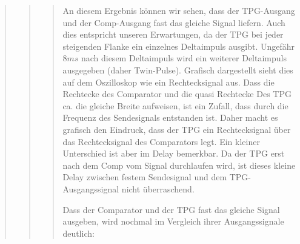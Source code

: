 \begin{quote}
\begin{quote}
\begin{quote}
           An diesem Ergebnis können wir sehen, dass der TPG-Ausgang und der
           Comp-Ausgang fast das gleiche Signal liefern. Auch dies entspricht
           unseren Erwartungen, da der TPG bei jeder steigenden Flanke ein
           einzelnes Deltaimpuls ausgibt. Ungefähr $8ms$ nach diesem Deltaimpuls
           wird ein weiterer Deltaimpuls ausgegeben (daher Twin-Pulse). Grafisch
           dargestellt sieht dies auf dem Oszilloskop wie ein Rechtecksignal
           aus. Dass die Rechtecke des Comparator und die quasi Rechtecke Des
           TPG ca. die gleiche Breite aufweisen, ist ein Zufall, dass durch die
           Frequenz des Sendesignals entstanden ist. Daher macht es grafisch
           den Eindruck, dass der TPG ein Rechtecksignal über das
           Rechtecksignal des Comparators legt. Ein kleiner Unterschied ist aber
           im Delay bemerkbar.
           Da der TPG erst nach dem Comp vom Signal durchlaufen wird, ist
           dieses kleine Delay zwischen festem Sendesignal und dem
           TPG-Ausgangssignal nicht überraschend.\\
           
           \vspace{0.5em}
           
           Dass der Comparator und der TPG fast das gleiche Signal ausgeben,
           wird nochmal im Vergleich ihrer Ausgangssignale deutlich:
           

\end{quote}
\end{quote}
\end{quote}
